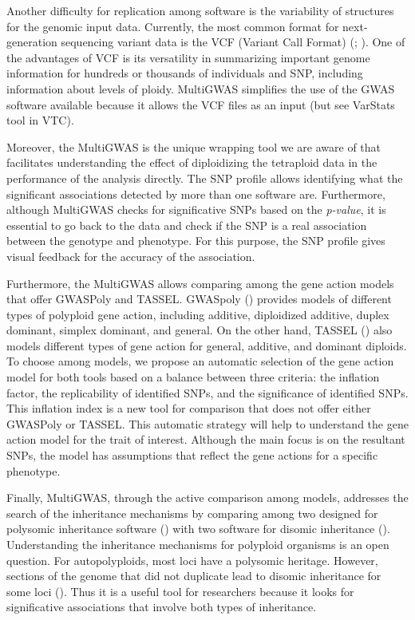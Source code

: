 \documentclass{article}
\begin{document}
Another difficulty for replication among software is the variability of structures for the genomic input data. Currently, the most common format for next-generation sequencing variant data is the VCF (Variant Call Format) (\cite{Danecek2011}; \cite{Ebbert2014}). One of the advantages of VCF is its versatility in summarizing important genome information for hundreds or thousands of individuals and SNP, including information about levels of ploidy. MultiGWAS simplifies the use of the GWAS software available because it allows the VCF files as an input (but see VarStats tool in VTC).  

Moreover, the MultiGWAS is the unique wrapping tool we are aware of that facilitates understanding the effect of diploidizing the tetraploid data in the performance of the analysis directly. The SNP profile allows identifying what the significant associations detected by more than one software are. Furthermore, although MultiGWAS checks for significative SNPs based on the \emph{p-value}, it is essential to go back to the data and check if the SNP is a real association between the genotype and phenotype. For this purpose, the SNP profile gives visual feedback for the accuracy of the association.

Furthermore, the MultiGWAS allows comparing among the gene action models that offer GWASPoly and TASSEL. GWASpoly (\cite{Rosyara2016}) provides models of different types of polyploid gene action, including additive, diploidized additive, duplex dominant, simplex dominant, and general. On the other hand, TASSEL (\cite{Bradbury2007}) also models different types of gene action for general, additive, and dominant diploids. To choose among models, we propose an automatic selection of the gene action model for both tools based on a balance between three criteria: the inflation factor, the replicability of identified SNPs, and the significance of identified SNPs. This inflation index is a new tool for comparison that does not offer either GWASPoly or TASSEL. This automatic strategy will help to understand the gene action model for the trait of interest. Although the main focus is on the resultant SNPs, the model has assumptions that reflect the gene actions for a specific phenotype.

Finally, MultiGWAS, through the active comparison among models, addresses the search of the inheritance mechanisms by comparing among two designed for polysomic inheritance software (\cite{Rosyara2016, Shen2016}) with two software for disomic inheritance (\cite{Purcell2007, Bradbury2007}). Understanding the inheritance mechanisms for polyploid organisms is an open question. For autopolyploids, most loci have a polysomic heritage. However, sections of the genome that did not duplicate lead to disomic inheritance for some loci (\cite{ohno1970, lynch2000,dufresne2014}). Thus it is a useful tool for researchers because it looks for significative associations that involve both types of inheritance.
\end{document}
